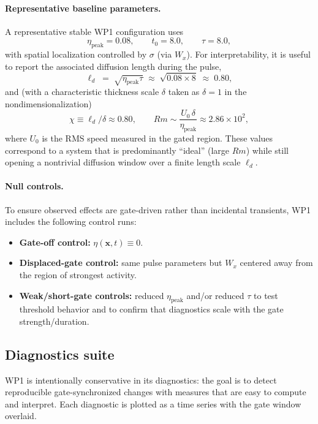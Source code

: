 \documentclass[11pt]{article}
\theoremstyle{plain}
\theoremstyle{definition}
\theoremstyle{remark}
\begin{document}
\paragraph{Representative baseline parameters.}
A representative stable WP1 configuration uses
\begin{equation}\label{eq:wp1_params}
  \eta_{\text{peak}} = 0.08,\qquad t_0 = 8.0,\qquad \tau = 8.0,
\end{equation}
with spatial localization controlled by $\sigma$ (via $W_x$). For interpretability, it is useful to
report the associated diffusion length during the pulse,
\begin{equation}\label{eq:wp1_ld}
  \ell_d \;=\; \sqrt{\eta_{\text{peak}}\tau}\;\approx\;\sqrt{0.08\times 8}\;\approx\;0.80,
\end{equation}
and (with a characteristic thickness scale $\delta$ taken as $\delta=1$ in the nondimensionalization)
\begin{equation}\label{eq:wp1_chi_rm}
  \chi \equiv \ell_d/\delta \approx 0.80,
  \qquad
  Rm \sim \frac{U_0\,\delta}{\eta_{\text{peak}}}\approx 2.86\times 10^2,
\end{equation}
where $U_0$ is the RMS speed measured in the gated region. These values correspond to a system that is
predominantly ``ideal'' (large $Rm$) while still opening a nontrivial diffusion window over a finite
length scale $\ell_d$.

\paragraph{Null controls.}
To ensure observed effects are gate-driven rather than incidental transients, WP1 includes the
following control runs:
\begin{itemize}[leftmargin=*]
  \item \textbf{Gate-off control:} $\eta(\mathbf{x},t)\equiv 0$.
  \item \textbf{Displaced-gate control:} same pulse parameters but $W_x$ centered away from the region of
  strongest activity.
  \item \textbf{Weak/short-gate controls:} reduced $\eta_{\text{peak}}$ and/or reduced $\tau$ to test
  threshold behavior and to confirm that diagnostics scale with the gate strength/duration.
\end{itemize}

\subsection{Diagnostics suite}\label{sec:wp1_diagnostics}
WP1 is intentionally conservative in its diagnostics: the goal is to detect reproducible gate-synchronized
changes with measures that are easy to compute and interpret. Each diagnostic is plotted as a time
series with the gate window overlaid.
\end{document}
